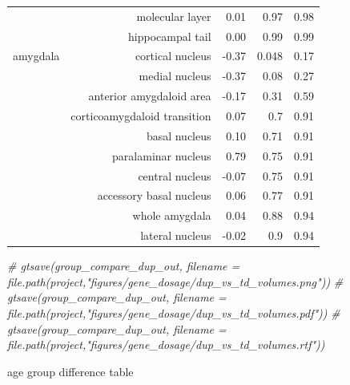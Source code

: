 \documentclass[
]{article}
\newenvironment{Shaded}{\begin{snugshade}}{\end{snugshade}}
\newcommand{\AttributeTok}[1]{\textcolor[rgb]{0.77,0.63,0.00}{#1}}
\newcommand{\CommentTok}[1]{\textcolor[rgb]{0.56,0.35,0.01}{\textit{#1}}}
\newcommand{\DecValTok}[1]{\textcolor[rgb]{0.00,0.00,0.81}{#1}}
\newcommand{\FunctionTok}[1]{\textcolor[rgb]{0.00,0.00,0.00}{#1}}
\newcommand{\NormalTok}[1]{#1}
\newcommand{\OtherTok}[1]{\textcolor[rgb]{0.56,0.35,0.01}{#1}}
\newcommand{\SpecialCharTok}[1]{\textcolor[rgb]{0.00,0.00,0.00}{#1}}
\newcommand{\StringTok}[1]{\textcolor[rgb]{0.31,0.60,0.02}{#1}}
\begin{document}
\begin{longtable}{rrrrr}
 & molecular layer & 0.01 & 0.97 & 0.98 \\ 
 & hippocampal tail & 0.00 & 0.99 & 0.99 \\ 
amygdala & cortical nucleus & -0.37 & 0.048 & 0.17 \\ 
 & medial nucleus & -0.37 & 0.08 & 0.27 \\ 
 & anterior amygdaloid area & -0.17 & 0.31 & 0.59 \\ 
 & corticoamygdaloid transition & 0.07 & 0.7 & 0.91 \\ 
 & basal nucleus & 0.10 & 0.71 & 0.91 \\ 
 & paralaminar nucleus & 0.79 & 0.75 & 0.91 \\ 
 & central nucleus & -0.07 & 0.75 & 0.91 \\ 
 & accessory basal nucleus & 0.06 & 0.77 & 0.91 \\ 
 & whole amygdala & 0.04 & 0.88 & 0.94 \\ 
 & lateral nucleus & -0.02 & 0.9 & 0.94 \\ 
\bottomrule
\end{longtable}

\begin{Shaded}
\begin{Highlighting}[]
\CommentTok{\# gtsave(group\_compare\_dup\_out, filename = file.path(project,"figures/gene\_dosage/dup\_vs\_td\_volumes.png"))}
\CommentTok{\# gtsave(group\_compare\_dup\_out, filename = file.path(project,"figures/gene\_dosage/dup\_vs\_td\_volumes.pdf"))}
\CommentTok{\# gtsave(group\_compare\_dup\_out, filename = file.path(project,"figures/gene\_dosage/dup\_vs\_td\_volumes.rtf"))}
\end{Highlighting}
\end{Shaded}

age group difference table

\begin{Shaded}
\end{Shaded}
\end{document}
